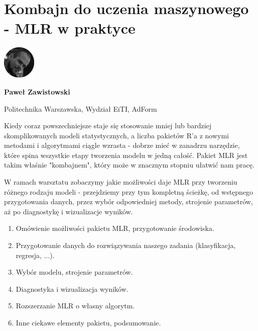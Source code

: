 \documentclass[\main/boa.tex]{subfiles}
\begin{document}
\section[Kombajn do uczenia maszynowego - MLR w praktyce]{Kombajn do uczenia maszynowego \\- MLR w praktyce}
\begin{minipage}[t]{0.915\textwidth}
	\center     
    \includegraphics[width=60px]{img/workshops/czarno_biale/pzawistowski-crop.png} 
\end{minipage}

\begin{minipage}{0.915\textwidth}
\centering
{\bf {} Paweł Zawistowski}
\end{minipage}

\vskip 0.3cm

\begin{affiliations}
\begin{minipage}{0.915\textwidth}
\centering
\large Politechnika Warszawska, Wydział EiTI, AdForm  \\[2pt]
\end{minipage}
\end{affiliations}

\vskip 0.8cm

\opiswarsztatu Kiedy coraz powszechniejsze staje się stosowanie mniej lub bardziej skomplikowanych modeli statystycznych, a liczba pakietów R'a z nowymi metodami i algorytmami ciągle wzrasta - dobrze mieć w zanadrzu narzędzie, które spina wszystkie etapy tworzenia modelu w jedną całość. Pakiet MLR jest takim właśnie "kombajnem", który może w znacznym stopniu ułatwić nam pracę. 

W ramach warsztatu zobaczymy jakie możliwości daje MLR przy tworzeniu różnego rodzaju modeli - przejdziemy przy tym kompletną ścieżkę, od wstępnego przygotowania danych, przez wybór odpowiedniej metody, strojenie parametrów, aż po diagnostykę i wizualizacje wyników.

\planwarsztatu
\begin{enumerate}
\item Omówienie możliwości pakietu MLR, przygotowanie środowiska.
\item Przygotowanie danych do rozwiązywania naszego zadania (klasyfikacja, regresja, ...).
\item Wybór modelu, strojenie parametrów.
\item Diagnostyka i wizualizacja wyników.
\item Rozszerzanie MLR o własny algorytm.
\item Inne ciekawe elementy pakietu, podsumowanie.
\end{enumerate}	 
\end{document}
